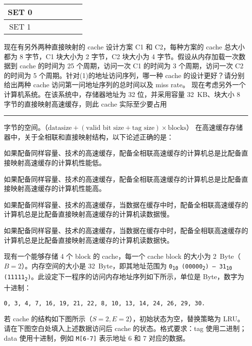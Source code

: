 \begin{problems}
\begin{table}[H]
\begin{tabular}{|c|c|c|c|c|c|c|}
                SET 0 &  &  &  &  &  &  \\ \hline
                SET 1 &  &  &  &  &  &  \\ \hline
            \end{tabular}
        \end{table}
        \qn 现在有另外两种直接映射的 cache 设计方案 C1 和 C2，每种方案的 cache 总大小都为 8 字节，C1 块大小为 2 字节，C2 块大小为 4 字节。假设从内存加载一次数据到 cache 的时间为 25 个周期，访问一次 C1 的时间为 3 个周期，访问一次 C2 的时间为 5 个周期。针对(1)的地址访问序列，哪一种 cache 的设计更好？请分别给出两种 cache 访问第一问地址序列的总时间以及 miss rate。
        \qn 现在考虑另外一个计算机系统。在该系统中，存储器地址为 32 位，并采用容量 \SI{32}{KB}、块大小 8 字节的直接映射高速缓存，则此 cache 实际至少要占用 \rule{2.5cm}{0.25mm} 字节的空间。（$\text{datasize} + (\text{valid bit size} + \text{tag size}) \times \text{blocks}$）
         在高速缓存存储器中，关于全相联和直接映射结构，以下论述正确的是：
        \begin{choices}
            \item 如果配备同样容量、技术的高速缓存，配备全相联高速缓存的计算机总是比配备直接映射高速缓存的计算机性能低。
            \item 如果配备同样容量、技术的高速缓存，配备全相联高速缓存的计算机总是比配备直接映射高速缓存的计算机性能高。
            \item 如果配备同样容量、技术的高速缓存，当数据在缓存中时，配备全相联高速缓存的计算机总是比配备直接映射高速缓存的计算机读数据慢。
            \item 如果配备同样容量、技术的高速缓存，当数据在缓存中时，配备全相联高速缓存的计算机总是比配备直接映射高速缓存的计算机读数据快。
        \end{choices}
         现有一个能够存储 4 个 block 的 cache，每一个 cache block 的大小为 \SI{2}{Byte}（$B=2$）。内存空间的大小是 \SI{32}{Byte}，即其地址范围为 \texttt{0\textsubscript{10} (00000\textsubscript{2}) --- 31\textsubscript{10} (11111\textsubscript{2})}。此设定下一程序的访问内存地址序列如下所示，单位是 Byte，数字为十进制：
        \begin{center}
            \tt 0, 3, 4, 7, 16, 19, 21, 22, 8, 10, 13, 14, 24, 26, 29, 30.
        \end{center}
        \qn 若 cache 的结构如下图所示（$S=2, E=2$），初始状态为空，替换策略为 LRU。请在下图空白处填入上述数据访问后 cache 的状态。格式要求：tag 使用二进制；data 使用十进制，例如 \verb|M[6-7]| 表示地址 6 和 7 对应的数据。
        \begin{table}[H]

\end{table}
\end{problems}
